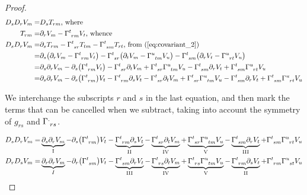 \documentclass[]{article}
\begin{document}
\begin{proof}
	\begin{align*}
		D_s D_r V_m =& D_s T_{rm} \text{, where}\\
		T_{rm}=& \partial_r V_m -\Gamma \indices{^t_{rm}} V_t \text{, whence}\\
		D_s D_r V_m	=& \partial_s T_{rm} - \Gamma\indices{^t_{sr}} T_{tm} - \Gamma\indices{^t_{sm}} T_{rt} \text{, from (\ref{eq:covariant_2})}\\
		=& \partial_s \big(\partial_r V_m -\Gamma \indices{^t_{rm}} V_t\big) - \Gamma\indices{^t_{sr}} \big(\partial_t V_m -\Gamma \indices{^u_{tm}} V_u\big) - \Gamma\indices{^t_{sm}} \big(\partial_r V_t -\Gamma \indices{^u_{rt}} V_u\big)\\
		=& \partial_s \partial_r V_m - \partial_s \big( \Gamma \indices{^t_{rm}} V_t\big) - \Gamma\indices{^t_{sr}}\partial_t V_m + \Gamma\indices{^t_{sr}} \Gamma \indices{^u_{tm}} V_u - \Gamma\indices{^t_{sm}} \partial_r V_t + \Gamma\indices{^t_{sm}}\Gamma \indices{^u_{rt}} V_u\\
		=& \partial_s \partial_r V_m - \partial_s \big( \Gamma \indices{^t_{rm}} \big)V_t -  \Gamma \indices{^t_{rm}}  \partial_s V_t - \Gamma\indices{^t_{sr}}\partial_t V_m +  \Gamma\indices{^t_{sr}} \Gamma \indices{^u_{tm}} V_u - \Gamma\indices{^t_{sm}} \partial_r V_t + \Gamma\indices{^t_{sm}}\Gamma \indices{^u_{rt}} V_u
	\end{align*}
	
	We interchange the subscripts $r$ and $s$ in the last equation, and then mark the terms that can be cancelled when we subtract, taking into account the symmetry of $g_{rs}$ and $\Gamma\indices{^._{rs}}$.
	
	\begin{align*}
		D_s D_r V_m =&\underbrace{\partial_s \partial_r V_m}_\text{I} - \partial_s \big( \Gamma \indices{^t_{rm}} \big)V_t -  \underbrace{\Gamma \indices{^t_{rm}}  \partial_s V_t}_\text{II} - \underbrace{\Gamma\indices{^t_{sr}}\partial_t V_m}_\text{IV} +  \underbrace{\Gamma\indices{^t_{sr}} \Gamma \indices{^u_{tm}} V_u}_\text{V} - \underbrace{\Gamma\indices{^t_{sm}} \partial_r V_t}_\text{III} + \Gamma\indices{^t_{sm}}\Gamma \indices{^u_{rt}} V_u\\
		D_r D_s V_m =&\underbrace{\partial_r \partial_r V_m}_I - \partial_r \big( \Gamma \indices{^t_{sm}} \big)V_t -  \underbrace{\Gamma \indices{^t_{sm}}  \partial_r V_t}_\text{III} - \underbrace{\Gamma\indices{^t_{rs}}\partial_t V_m}_\text{IV} +  \underbrace{\Gamma\indices{^t_{rs}} \Gamma \indices{^u_{tm}} V_u}_\text{V} - \underbrace{\Gamma\indices{^t_{rm}} \partial_s V_t}_\text{II} + \Gamma\indices{^t_{rm}}\Gamma \indices{^u_{st}} V_u
	\end{align*}
	

\end{proof}
\end{document}
